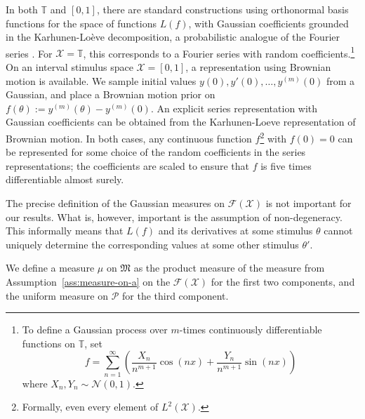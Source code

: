 In both $\mathbb{T}$ and $[0,1]$, there are standard constructions using orthonormal basis functions for the space of functions $L(f)$, with Gaussian coefficients grounded in the Karhunen-Lo{\`e}ve decomposition, a probabilistic analogue of the Fourier series \cite{karhunen1947lineare, loeve1948functions, papoulis1965random}. 
For $\mathcal{X} = \mathbb{T}$, this corresponds to a Fourier series with random coefficients.\footnote{To define a Gaussian process over $m$-times continuously differentiable functions on $\mathbb{T}$, set
\begin{equation}
    f = \sum_{n=1}^\infty \left(\frac{X_n}{n^{m+1}} \cos(nx) + \frac{Y_n}{n^{m+1}} \sin(nx)\right)
\end{equation}
where $X_n, Y_n \sim \mathcal{N}(0,1)$.}
On an interval stimulus space $\mathcal{X} = [0,1]$, a representation using Brownian motion is available.
We sample initial values $y(0), y'(0), \dots, y^{(m)}(0)$ from a Gaussian, and place a Brownian motion prior on $f(\theta) := y^{(m)}(\theta) - y^{(m)}(0)$.
An explicit series representation with Gaussian coefficients can be obtained from the Karhunen-Loeve representation of Brownian motion.
In both cases, any continuous function $f$\footnote{Formally, even every element of $L^2(\mathcal{X})$.} with $f(0) = 0$ can be represented for some choice of the random coefficients in the series representations; the coefficients are scaled to ensure that $f$ is five times differentiable almost surely.



The precise definition of the Gaussian measures on $\mathcal{F}(\mathcal{X})$ is not important for our results.
What is, however, important is the assumption of non-degeneracy. This informally means that $L(f)$ and its derivatives at some stimulus $\theta$ cannot uniquely determine the corresponding values at some other stimulus $\theta'$.

\begin{assumption}\label{ass:measure-on-prod}
We define a measure $\mu$ on $\mathfrak{M}$ as the product measure of the measure from Assumption~\ref{ass:measure-on-a} on the $\mathcal{F}(\mathcal{X})$ for the first two components, and the uniform measure on $\mathcal{P}$ for the third component.
\end{assumption}




